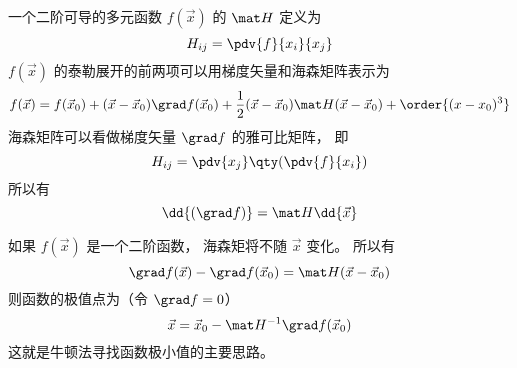 
一个二阶可导的多元函数 $f(\vec x)$ 的 $\mat H$ 定义为
\begin{equation}
H_{ij} = \pdv{f}{x_i}{x_j}
\end{equation}
$f(\vec x)$ 的泰勒展开的前两项可以用梯度矢量和海森矩阵表示为
\begin{equation}
f(\vec x) = f(\vec x_0) + (\vec x - \vec x_0) \grad f(\vec x_0) + \frac12(\vec x - \vec x_0) \mat H (\vec x - \vec x_0) + \order{(x-x_0)^3}
\end{equation}
海森矩阵可以看做梯度矢量 $\grad f$ 的雅可比矩阵， 即
\begin{equation}
H_{ij} = \pdv{x_j} \qty(\pdv{f}{x_i})
\end{equation}
所以有
\begin{equation}
\dd{(\grad f)} = \mat H \dd{\vec x}
\end{equation}

如果 $f(\vec x)$ 是一个二阶函数， 海森矩将不随 $\vec x$ 变化。 所以有
\begin{equation}
\grad f(\vec x) - \grad f(\vec x_0) = \mat H (\vec x - \vec x_0)
\end{equation}
则函数的极值点为（令 $\grad f = 0$）
\begin{equation}
\vec x = \vec x_0 - \mat H^{-1} \grad f(\vec x_0)
\end{equation}
这就是牛顿法寻找函数极小值的主要思路。
